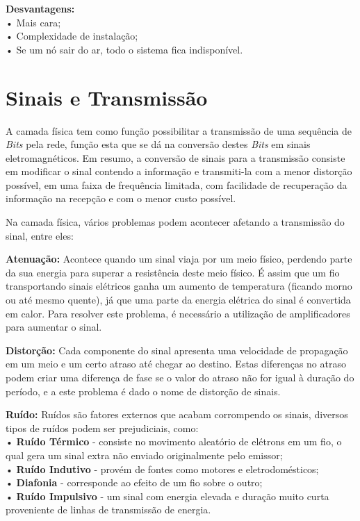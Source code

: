 \textbf{Desvantagens:}\\
• Mais cara;\\
• Complexidade de instalação;\\
• Se um nó sair do ar, todo o sistema fica indisponível.\\


\newpage\thispagestyle{empty}
\section{\textbf{Sinais e Transmissão}}
\par A camada física tem como função possibilitar a transmissão de uma sequência de \textit{Bits} pela rede, função esta que se dá na conversão destes \textit{Bits} em sinais eletromagnéticos. Em resumo, a conversão de sinais para a transmissão consiste em modificar o sinal contendo a informação e transmiti-la com a menor distorção possível, em uma faixa de frequência limitada, com facilidade de recuperação da informação na recepção e com o menor custo possível.

\par Na camada física, vários problemas podem acontecer afetando a transmissão do sinal, entre eles:
\par \textbf{Atenuação:} Acontece quando um sinal viaja por um meio físico, perdendo parte da sua energia para superar a resistência deste meio físico. É assim que um fio transportando sinais elétricos ganha um aumento de temperatura (ficando morno ou até mesmo quente), já que uma parte da energia elétrica do sinal é convertida em calor. Para resolver este problema, é necessário a utilização de amplificadores para aumentar o sinal.

\par \textbf{Distorção:} Cada componente do sinal apresenta uma velocidade de propagação em um meio e um certo atraso até chegar ao destino. Estas diferenças no atraso podem criar uma diferença de fase se o valor do atraso não for igual à duração do período, e a este problema é dado o nome de distorção de sinais.

\par \textbf{Ruído:} Ruídos são fatores externos que acabam corrompendo os sinais, diversos tipos de ruídos podem ser prejudiciais, como:\\
• \textbf{Ruído Térmico} - consiste no movimento aleatório de elétrons em um fio, o qual gera um sinal extra não enviado originalmente pelo emissor;\\
• \textbf{Ruído Indutivo} - provém de fontes como motores e eletrodomésticos;\\
• \textbf{Diafonia} - corresponde ao efeito de um fio sobre o outro;\\
• \textbf{Ruído Impulsivo} - um sinal com energia elevada e duração muito curta proveniente de linhas de transmissão de energia.\\



